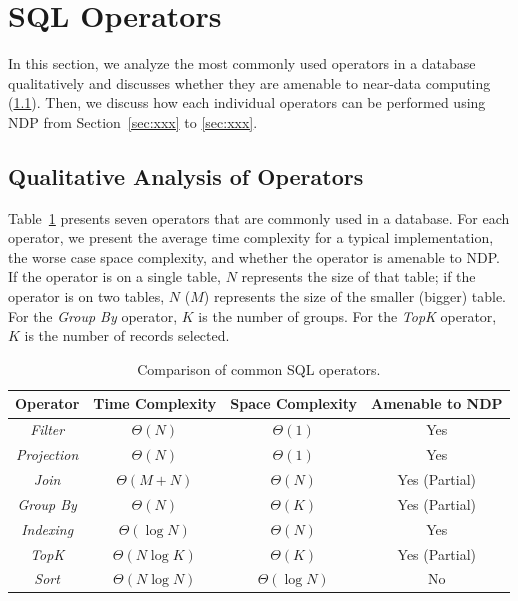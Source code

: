 \documentclass{article}
\newcommand{\filter}{\textit{Filter}\xspace}
\newcommand{\projection}{\textit{Projection}\xspace}
\newcommand{\join}{\textit{Join}\xspace}
\newcommand{\sort}{\textit{Sort}\xspace}
\newcommand{\indexing}{\textit{Indexing}\xspace}
\newcommand{\groupby}{\textit{Group By}\xspace}
\newcommand{\topk}{\textit{TopK}\xspace}
\begin{document}
\section{SQL Operators}

In this section, we analyze the most commonly used operators in a database qualitatively and discusses whether they are amenable to near-data computing (\cref{sec:analysis}). Then, we discuss how each individual operators can be performed using NDP from Section~\ref{sec:xxx} to \ref{sec:xxx}. 

\subsection{Qualitative Analysis of Operators} \label{sec:analysis}

Table~\ref{tab:operators} presents seven operators that are commonly used in a database. For each operator, we present the average time complexity for a typical implementation, the worse case space complexity, and whether the operator is amenable to NDP. If the operator is on a single table, $N$ represents the size of that table; if the operator is on two tables, $N$ ($M$) represents the size of the smaller (bigger) table. For the \textit{Group By} operator, $K$ is the number of groups. For the \textit{TopK} operator, $K$ is the number of records selected. 

\begin{table}
\centering 
\begin{tabular}{ |c|c|c|c| } 
 \hline
 Operator       & Time Complexity & Space Complexity  & Amenable to NDP \\ \hline
 \filter        & $\Theta(N)$     & $\Theta(1)$       & Yes             \\ \hline
 \projection    & $\Theta(N)$     & $\Theta(1)$       & Yes             \\ \hline
 \join          & $\Theta(M + N)$ & $\Theta(N)$       & Yes (Partial)   \\ \hline
 \groupby       & $\Theta(N)$     & $\Theta(K)$       & Yes (Partial)   \\ \hline
 \indexing      & $\Theta(\log{N})$ & $\Theta(N)$     & Yes             \\ \hline
 \topk          & $\Theta(N\log{K})$ & $\Theta(K)$    & Yes (Partial)   \\ \hline
 \sort          & $\Theta(N\log{N})$ & $\Theta(\log{N})$ & No           \\ \hline
\end{tabular}
\caption{Comparison of common SQL operators.}
\label{tab:operators}
\end{table}
\end{document}
